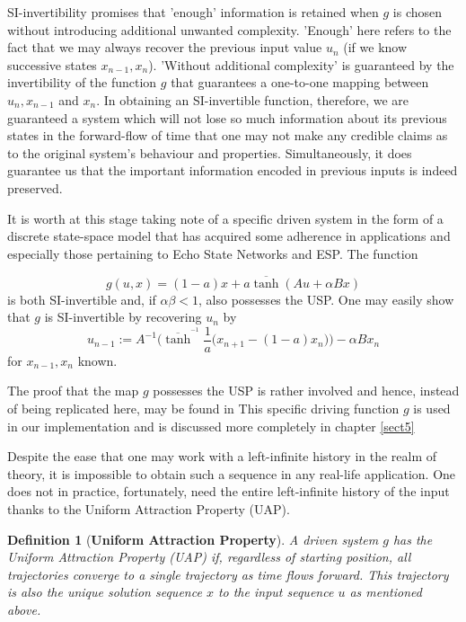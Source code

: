 \documentclass[a4paper,12pt,twoside]{report}
\newtheorem{Definition}{Definition}[]
\begin{document}
SI-invertibility promises that 'enough' information is retained when $g$ is chosen without introducing additional unwanted complexity.  
'Enough' here refers to the fact that we may always recover the previous input value $u_n$ (if we know successive states $x_{n-1}, x_n$).
'Without additional complexity' is guaranteed by the invertibility of the function $g$ that guarantees a one-to-one mapping between $u_n, x_{n-1}$ and $x_n$. 
In obtaining an SI-invertible function, therefore, we are guaranteed a system which will not lose so much information about its previous states in the forward-flow of time that one may not make any credible claims as to the original system's behaviour and properties. 
Simultaneously, it does guarantee us that the important information encoded in previous inputs is indeed preserved.

It is worth at this stage taking note of a specific driven system in the form of a discrete state-space model that has acquired some adherence in applications \cite{Manju_IEEE} and especially those pertaining to Echo State Networks and ESP. The function 

\begin{equation}  \label{eqn_driving}
  g(u,x) = (1-a)x + a\overline{\tanh}(Au + \alpha Bx)
\end{equation} 
is both SI-invertible and, if $\alpha\beta<1$, also possesses the USP. 
One may easily show that $g$ is SI-invertible by recovering $u_n$ by 
\begin{equation} \label{eqn_SI_RNN}
  u_{n-1} := A^{-1}\bigg(\overline{\tanh}^{^{-1}}\frac{1}{a}\Big(x_{n+1}-(1-a)x_n\Big) \bigg) - \alpha B x_n
  \end{equation}
  for $x_{n-1}, x_n$ known.

The proof that the map $g$ possesses the USP is rather involved and hence, instead of being replicated here, may be found in \cite[Th.2]{manjunath2013echo }
This specific driving function $g$ is used in our implementation and is discussed more completely in chapter \ref{sect5}

Despite the ease that one may work with a left-infinite history in the realm of theory, it is impossible to obtain such a sequence in any real-life application.  
One does not in practice, fortunately, need the entire left-infinite history of the input thanks to the Uniform Attraction Property (UAP).

\begin{Definition}
  [\bf Uniform Attraction Property]\label{Dfn_UAP}\rm
  A driven system $g$ has the Uniform Attraction Property (UAP) if, regardless of starting position, all trajectories converge to a single trajectory as time flows forward. 
  This trajectory is also the unique solution sequence $x$ to the input sequence $u$ as mentioned above.
\end{Definition}
\end{document}
